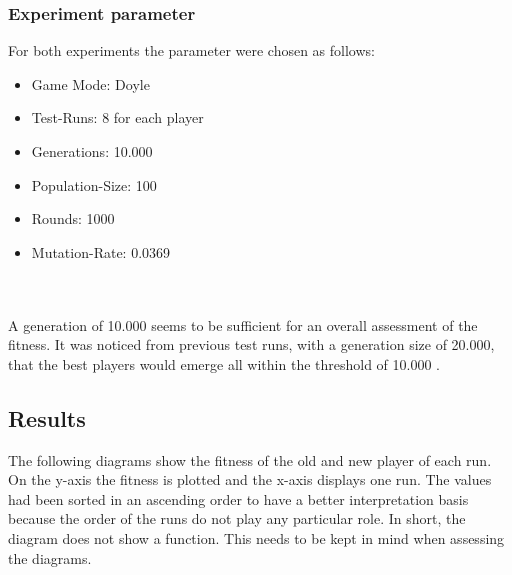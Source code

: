 \documentclass[12pt,fleqn,a4paper]{article}
\begin{document}
\subsubsection{Experiment parameter}
For both experiments the parameter were chosen as follows: 
\begin{itemize}
	\item Game Mode:       Doyle
	\item Test-Runs:       8 for each player
	\item Generations:     10.000
	\item Population-Size: 100
	\item Rounds:          1000
	\item Mutation-Rate:   0.0369
\end{itemize}
\\ 
\\
A generation of 10.000 seems to be sufficient for an overall assessment of the fitness. It was noticed from previous test runs, with a generation size of 20.000, that the best players would emerge all within the threshold of 10.000 .

\subsection{Results}
The following diagrams show the fitness of the old and new player of each run. \\
On the y-axis the fitness is plotted and the x-axis displays one run. The values had been sorted in an ascending order to have a better interpretation basis because the order of the runs do not play any particular role. In short, the diagram does not show a function. This needs to be kept in mind when assessing the diagrams.
\end{document}
